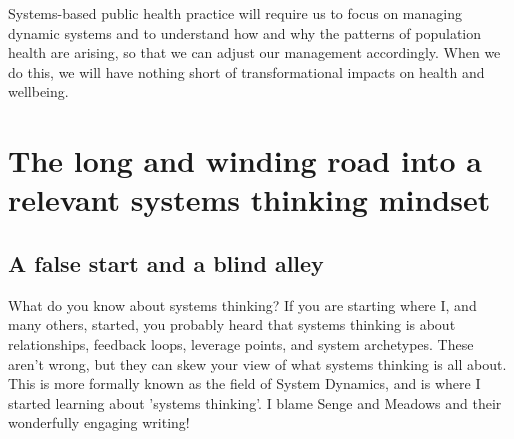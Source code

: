 Systems-based public health practice will require us to focus on managing dynamic systems and to understand how and why the patterns of population health are arising, so that we can adjust our management accordingly. When we do this, we will have nothing short of transformational impacts on health and wellbeing.


%
\section{The long and winding road into a relevant systems thinking mindset}
\subsection{A false start and a blind alley}
What do you know about systems thinking? If you are starting where I, and many others, started, you probably heard that systems thinking is about relationships, feedback loops, leverage points, and system archetypes. These aren't wrong, but they can skew your view of what systems thinking is all about. This is more formally known as the field of System Dynamics, and is where I started learning about 'systems thinking'. I blame Senge\cite{senge2010fifth} and Meadows\cite{meadows2008thinking} and their wonderfully engaging writing!

